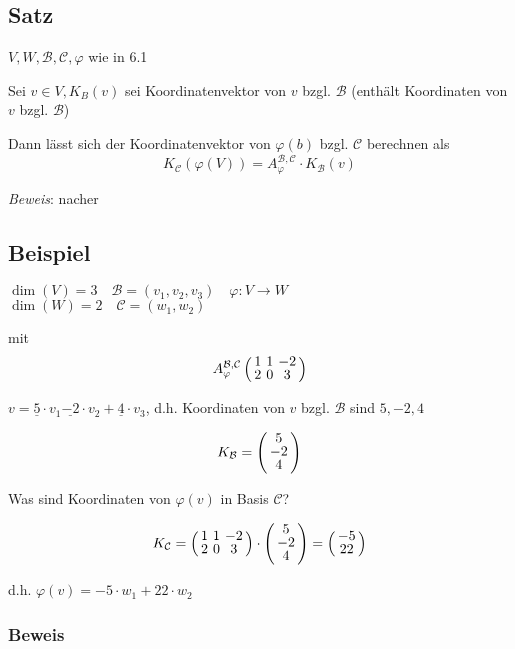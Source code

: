 \subsection{Satz}

$V,W,\mathcal{B},\mathcal{C},\varphi$ wie in 6.1\bigskip

Sei $v \in V,K_B(v)$ sei Koordinatenvektor von $v$ bzgl. $\mathcal{B}$ (enthält Koordinaten von $v$ bzgl. $\mathcal{B}$)

Dann lässt sich der Koordinatenvektor von $\varphi(b)$ bzgl. $\mathcal{C}$ berechnen als
\[K_\mathcal{C}(\varphi(V)) = A_\varphi^{\mathcal{B},\mathcal{C}} \cdot K_\mathcal{B}(v)\]

\emph{Beweis}: nacher

\subsection{Beispiel}

$\dim(V) = 3 \quad \mathcal{B} = (v_1,v_2,v_3) \quad \varphi: V \rightarrow W$\\
$\dim(W) = 2 \quad \mathcal{C} = (w_1,w_2)$

mit
\[A_\varphi^{\mathcal{B},\mathcal{C}} \aMatrix{ccc}{1 & 1 & -2 \\ 2 & 0 & 3}\]

$v = \underline{5}\cdot v_1 \underline{-2} \cdot v_2 +\underline{4} \cdot v_3$, d.h. Koordinaten von $v$ bzgl. $\mathcal{B}$ sind $5,-2,4$

\[K_\mathcal{B} =
\aMatrix{c}
{5\\-2\\4}
\]

Was sind Koordinaten von $\varphi(v)$ in Basis $\mathcal{C}$?

\[
K_\mathcal{C} = \aMatrix{ccc}{1 & 1 & -2 \\ 2 & 0 & 3}\cdot
\aMatrix{c}{5\\-2\\4}= \weirdvct{-5}{22}
\]

d.h. $\varphi(v) = -5 \cdot w_1 + 22 \cdot w_2$\bigskip

\subsubsection*{Beweis}


